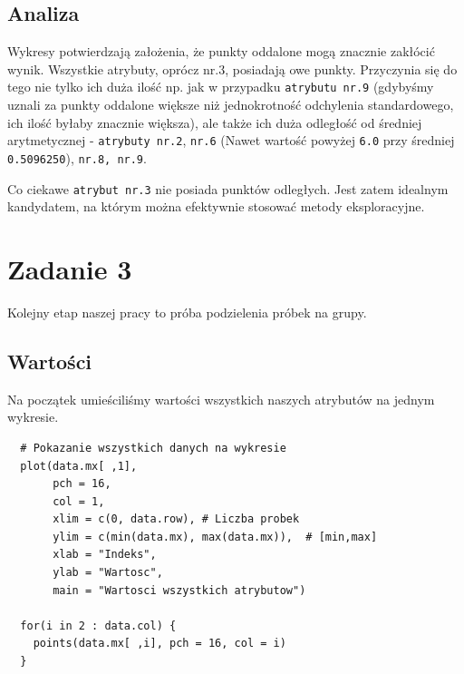 \documentclass[a4paper,12pt,twoside]{article}
\begin{document}
\subsection{Analiza}

Wykresy potwierdzają założenia, że punkty oddalone mogą znacznie zakłócić wynik.
Wszystkie atrybuty, oprócz nr.3, posiadają owe punkty.
Przyczynia się do tego nie tylko ich duża ilość np. jak w przypadku \texttt{atrybutu nr.9}
(gdybyśmy uznali za punkty oddalone większe niż jednokrotność odchylenia standardowego,
ich ilość byłaby znacznie większa), ale także ich duża odległość od średniej arytmetycznej - \texttt{atrybuty nr.2},
\texttt{nr.6} (Nawet wartość powyżej \texttt{6.0} przy średniej \texttt{0.5096250}), \texttt{nr.8, nr.9}.

Co ciekawe \texttt{atrybut nr.3} nie posiada punktów odległych. Jest zatem idealnym kandydatem, na którym
można efektywnie stosować metody eksploracyjne.

\section{Zadanie 3}
\bigskip

Kolejny etap naszej pracy to próba podzielenia próbek na grupy.

\subsection{Wartości}

Na początek umieściliśmy wartości wszystkich naszych atrybutów na jednym wykresie.

\medskip
\begin{lstlisting}
  # Pokazanie wszystkich danych na wykresie
  plot(data.mx[ ,1],
       pch = 16,
       col = 1,
       xlim = c(0, data.row), # Liczba probek
       ylim = c(min(data.mx), max(data.mx)),  # [min,max]
       xlab = "Indeks",
       ylab = "Wartosc",
       main = "Wartosci wszystkich atrybutow")

  for(i in 2 : data.col) {
    points(data.mx[ ,i], pch = 16, col = i)
  }
\end{lstlisting}
\end{document}
